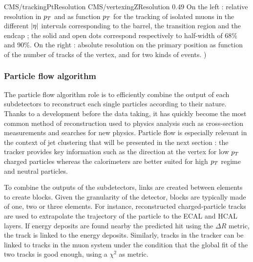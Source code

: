                          {CMS/trackingPtResolution}
                         {CMS/vertexingZResolution}
                         {0.49}
                         {On the left : relative resolution in $p_T$ and as function $p_T$ for the
                         tracking of isolated muons in the different $\left| \eta \right|$ intervals corresponding
                         to the barrel,
                         the transition region and the endcap ; the solid and open dots correspond respectively
                         to half-width of 68\% and 90\%. On the right : absolute resolution on the
                         primary position as function of the number of tracks of the vertex,
                         and for two kinds of events. \cite{CMStracking})}


            \subsubsection{Particle flow algorithm}

        The particle flow algorithm \cite{particleFlow} role is to efficiently combine the output of each
        subdetectors to reconstruct each single particles according to their nature. Thanks
        to a development before the data taking, it has quickly become the most common
        method of reconstruction used to physics analysis such as cross-section measurements
        and searches for new physics. Particle flow is especially relevant in the context
        of jet clustering that will be presented in the next section : the tracker provides
        key information such as the direction at the vertex for low $p_T$ charged particles
        whereas the calorimeters are better suited for high $p_T$ regime and neutral particles.

        To combine the outputs of the subdetectors, links are created between elements
        to create blocks. Given the granularity of the detector, blocks are typically made
        of one, two or three elements. For instance, reconstructed charged-particle tracks
        are used to extrapolate the trajectory of the particle to the ECAL and HCAL layers.
        If energy deposits are found nearby the predicted hit using the $\Delta R$
        metric, the track is linked to the energy deposits. Similarly, tracks in the
        tracker can be linked to tracks in the muon system under the condition that the
        global fit of the two tracks is good enough, using a $\chi^2$ as metric.

